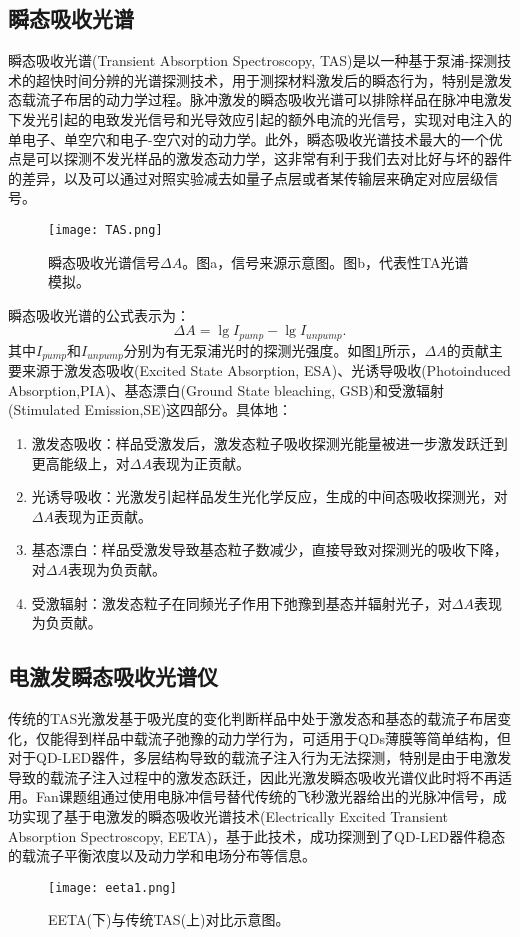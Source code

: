 \subsection{瞬态吸收光谱}
瞬态吸收光谱(Transient Absorption Spectroscopy, TAS)是以一种基于泵浦-探测技术的超快时间分辨的光谱探测技术，用于测探材料激发后的瞬态行为，特别是激发态载流子布居的动力学过程。脉冲激发的瞬态吸收光谱可以排除样品在脉冲电激发下发光引起的电致发光信号和光导效应引起的额外电流的光信号，实现对电注入的单电子、单空穴和电子-空穴对的动力学。此外，瞬态吸收光谱技术最大的一个优点是可以探测不发光样品的激发态动力学，这非常有利于我们去对比好与坏的器件的差异，以及可以通过对照实验减去如量子点层或者某传输层来确定对应层级信号。
\begin{figure}[ht]
	\centering
	\texttt{[image: TAS.png]}
	\caption{瞬态吸收光谱信号$\Delta A$。图a，信号来源示意图\cite{srivastava2023advanced}。图b，代表性TA光谱模拟\cite{jove65519}。}
	\label{fig:TAS}
\end{figure}
瞬态吸收光谱的公式表示为：
\begin{equation}
	\Delta A=\lg I_{pump}-\lg I_{unpump}.
	\label{eq:1}
\end{equation}
其中$I_{pump}$和$I_{unpump}$分别为有无泵浦光时的探测光强度。如图\ref{fig:TAS}所示，$\Delta A$的贡献主要来源于激发态吸收(Excited State Absorption, ESA)、光诱导吸收(Photoinduced Absorption,PIA)、基态漂白(Ground State bleaching, GSB)和受激辐射(Stimulated Emission,SE)这四部分。具体地：
\begin{enumerate}
	\item 激发态吸收：样品受激发后，激发态粒子吸收探测光能量被进一步激发跃迁到更高能级上，对$\Delta A$表现为正贡献。
	\item 光诱导吸收：光激发引起样品发生光化学反应，生成的中间态吸收探测光，对$\Delta A$表现为正贡献。
	\item 基态漂白：样品受激发导致基态粒子数减少，直接导致对探测光的吸收下降，对$\Delta A$表现为负贡献。
	\item 受激辐射：激发态粒子在同频光子作用下弛豫到基态并辐射光子，对$\Delta A$表现为负贡献。
\end{enumerate}

\subsection{电激发瞬态吸收光谱仪}
传统的TAS光激发基于吸光度的变化判断样品中处于激发态和基态的载流子布居变化，仅能得到样品中载流子弛豫的动力学行为，可适用于QDs薄膜等简单结构，但对于QD-LED器件，多层结构导致的载流子注入行为无法探测，特别是由于电激发导致的载流子注入过程中的激发态跃迁，因此光激发瞬态吸收光谱仪此时将不再适用。Fan课题组通过使用电脉冲信号替代传统的飞秒激光器给出的光脉冲信号，成功实现了基于电激发的瞬态吸收光谱技术(Electrically Excited Transient Absorption Spectroscopy, EETA)\cite{li2024transient,1025004826.nh}，基于此技术，成功探测到了QD-LED器件稳态的载流子平衡浓度以及动力学和电场分布等信息。
\begin{figure}[ht]
	\centering
	\texttt{[image: eeta1.png]}
	\caption{EETA(下)与传统TAS(上)对比示意图\cite{bian2024efficient}。}
	\label{fig:eeta1}
\end{figure}


